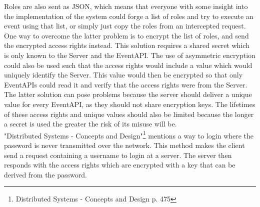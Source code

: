 Roles are also sent as JSON, which means that everyone with some insight into the implementation of the system could forge a list of roles and try to execute an event using that list, or simply just copy the roles from an intercepted request. One way to overcome the latter problem is to encrypt the list of roles, and send the encrypted access rights instead. This solution requires a shared secret which is only known to the Server and the EventAPI. The use of asymmetric encryption could also be used such that the access rights would include a value which would uniquely identify the Server. This value would then be encrypted so that only EventAPIs could read it and verify that the access rights were from the Server. The latter solution can pose problems because the server should deliver a unique value for every EventAPI, as they should not share encryption keys. The lifetimes of these access rights and unique values should also be limited because the longer a secret is used the greater the risk of its misuse will be.\\

"Distributed Systems - Concepts and Design"\footnote{Distributed Systems - Concepts and Design p. 475} mentions a way to login where the password is never transmitted over the network. This method makes the client send a request containing a username to login at a server. The server then responds with the access rights which are encrypted with a key that can be derived from the password.